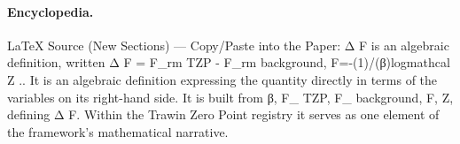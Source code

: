\paragraph{Encyclopedia.}
LaTeX Source (New Sections) — Copy/Paste into the Paper: Δ F is an algebraic definition, written Δ F = F\_rm TZP - F\_rm background, F=-(1)/(β)logmathcal Z .. It is an algebraic definition expressing the quantity directly in terms of the variables on its right-hand side. It is built from β, F\_ TZP, F\_ background, F, Z, defining Δ F. Within the Trawin Zero Point registry it serves as one element of the framework's mathematical narrative.
